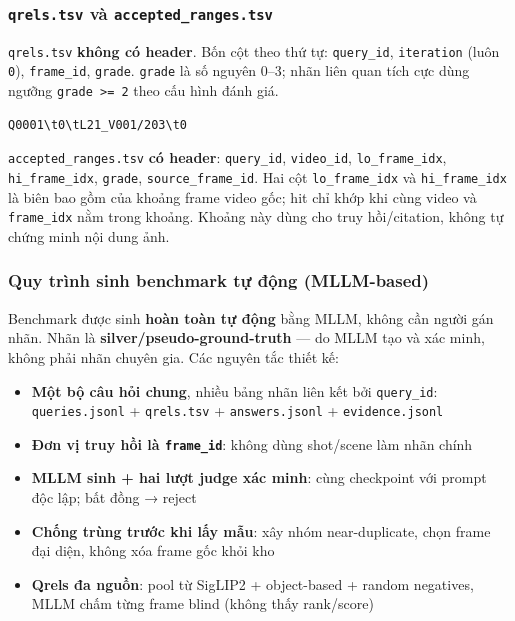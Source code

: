 \documentclass[12pt,a4paper,onecolumn]{article}
\begin{document}
\subsubsection{\texttt{qrels.tsv} và \texttt{accepted\_ranges.tsv}}

\texttt{qrels.tsv} \textbf{không có header}. Bốn cột theo thứ tự: \texttt{query\_id}, \texttt{iteration} (luôn \texttt{0}), \texttt{frame\_id}, \texttt{grade}. \texttt{grade} là số nguyên 0–3; nhãn liên quan tích cực dùng ngưỡng \texttt{grade >= 2} theo cấu hình đánh giá.

\begin{lstlisting}[]
Q0001\t0\tL21_V001/203\t0
\end{lstlisting}


\texttt{accepted\_ranges.tsv} \textbf{có header}: \texttt{query\_id}, \texttt{video\_id}, \texttt{lo\_frame\_idx}, \texttt{hi\_frame\_idx}, \texttt{grade}, \texttt{source\_frame\_id}. Hai cột \texttt{lo\_frame\_idx} và \texttt{hi\_frame\_idx} là biên bao gồm của khoảng frame video gốc; hit chỉ khớp khi cùng video và \texttt{frame\_idx} nằm trong khoảng. Khoảng này dùng cho truy hồi/citation, không tự chứng minh nội dung ảnh.

\subsubsection{Quy trình sinh benchmark tự động (MLLM-based)}

Benchmark được sinh \textbf{hoàn toàn tự động} bằng MLLM, không cần người gán nhãn. Nhãn là \textbf{silver/pseudo-ground-truth} — do MLLM tạo và xác minh, không phải nhãn chuyên gia. Các nguyên tắc thiết kế:

\begin{itemize}
  \item \textbf{Một bộ câu hỏi chung}, nhiều bảng nhãn liên kết bởi \texttt{query\_id}: \texttt{queries.jsonl} + \texttt{qrels.tsv} + \texttt{answers.jsonl} + \texttt{evidence.jsonl}
  \item \textbf{Đơn vị truy hồi là \texttt{frame\_id}}: không dùng shot/scene làm nhãn chính
  \item \textbf{MLLM sinh + hai lượt judge xác minh}: cùng checkpoint với prompt độc lập; bất đồng → reject
  \item \textbf{Chống trùng trước khi lấy mẫu}: xây nhóm near-duplicate, chọn frame đại diện, không xóa frame gốc khỏi kho
  \item \textbf{Qrels đa nguồn}: pool từ SigLIP2 + object-based + random negatives, MLLM chấm từng frame blind (không thấy rank/score)
\end{itemize}
\end{document}

